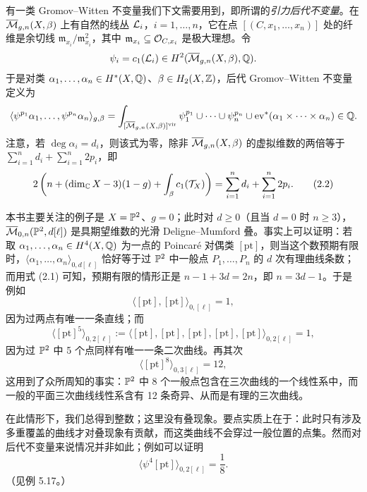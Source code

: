 有一类 Gromov–Witten 不变量我们下文需要用到，即所谓的\emph{引力后代不变量}。在 $\overline{\mathcal{M}}_{g,n}(X,\beta)$ 上有自然的线丛 $\mathcal{L}_i$，$i=1,\dots,n$，它在点 $[(C,x_1,\dots,x_n)]$ 处的纤维是余切线 $\mathfrak{m}_{x_i}/\mathfrak{m}_{x_i}^2$，其中 $\mathfrak{m}_{x_i}\subseteq\mathcal{O}_{C,x_i}$ 是极大理想。令
\[
\psi_i=c_1(\mathcal{L}_i)\in H^2(\overline{\mathcal{M}}_{g,n}(X,\beta),\mathbb{Q}).
\]
于是对类 $\alpha_1,\dots,\alpha_n\in H^{*}(X,\mathbb{Q})$、$\beta\in H_2(X,\mathbb{Z})$，后代 Gromov–Witten 不变量定义为
\[
\langle\psi^{p_1}\alpha_1,\dots,\psi^{p_n}\alpha_n\rangle_{g,\beta}=\int_{[\overline{\mathcal{M}}_{g,n}(X,\beta)]^{\mathrm{vir}}}\psi_1^{p_1}\cup\cdots\cup\psi_n^{p_n}\cup\mathrm{ev}^{*}(\alpha_1\times\cdots\times\alpha_n)\in\mathbb{Q}.
\]
注意，若 $\deg\alpha_i=d_i$，则该式为零，除非 $\overline{\mathcal{M}}_{g,n}(X,\beta)$ 的虚拟维数的两倍等于 $\sum_{i=1}^{n}d_i+\sum_{i=1}^{n}2p_i$，即
\begin{equation}
2\left(n+(\dim_{\mathbb{C}}X-3)(1-g)+\int_{\beta}c_1(\mathcal{T}_X)\right)=\sum_{i=1}^{n}d_i+\sum_{i=1}^{n}2p_i. \tag{2.2}
\end{equation}

\begin{example}
本书主要关注的例子是 $X=\mathbb{P}^2$、$g=0$；此时对 $d\ge 0$（且当 $d=0$ 时 $n\ge 3$），$\overline{\mathcal{M}}_{0,n}(\mathbb{P}^2,d[\ell])$ 是具期望维数的光滑 Deligne–Mumford 叠。事实上可以证明：若取 $\alpha_1,\dots,\alpha_n\in H^4(X,\mathbb{Q})$ 为一点的 Poincaré 对偶类 $[\mathrm{pt}]$，则当这个数预期有限时，$\langle\alpha_1,\dots,\alpha_n\rangle_{0,d[\ell]}$ 恰好等于过 $\mathbb{P}^2$ 中一般点 $P_1,\dots,P_n$ 的 $d$ 次有理曲线条数；而用式 (2.1) 可知，预期有限的情形正是 $n-1+3d=2n$，即 $n=3d-1$。于是例如
\[
\langle[\mathrm{pt}],[\mathrm{pt}]\rangle_{0,[\ell]}=1,
\]
因为过两点有唯一一条直线；而
\[
\langle[\mathrm{pt}]^5\rangle_{0,2[\ell]}:=\langle[\mathrm{pt}],[\mathrm{pt}],[\mathrm{pt}],[\mathrm{pt}],[\mathrm{pt}]\rangle_{0,2[\ell]}=1,
\]
因为过 $\mathbb{P}^2$ 中 5 个点同样有唯一一条二次曲线。再其次
\[
\langle[\mathrm{pt}]^8\rangle_{0,3[\ell]}=12,
\]
这用到了众所周知的事实：$\mathbb{P}^2$ 中 8 个一般点包含在三次曲线的一个线性系中，而一般的平面三次曲线线性系含有 12 条奇异、从而是有理的三次曲线。
\end{example}

在此情形下，我们总得到整数；这里没有叠现象。要点实质上在于：此时只有涉及多重覆盖的曲线才对叠现象有贡献，而这类曲线不会穿过一般位置的点集。然而对后代不变量来说情况并非如此；例如可以证明
\[
\langle\psi^4[\mathrm{pt}]\rangle_{0,2[\ell]}=\frac{1}{8}.
\]
（见例 5.17。）


